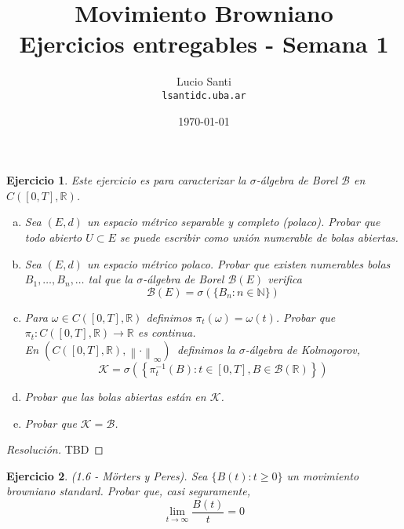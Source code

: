 \documentclass[a4paper,11pt]{article}
\title{Movimiento Browniano\\
      \small{Ejercicios entregables - Semana 1}}
\author{Lucio Santi\\
        \texttt{lsanti\at dc.uba.ar}}
\date{\today}
\newcommand{\norm}[1]{\left\lVert#1\right\rVert}
\newcommand{\CT}{\ensuremath{C([0,T], \mathbb{R})}}
\newcommand{\CTesp}{\ensuremath{(C([0,T], \mathbb{R}), \norm{\cdot}_{\infty})}}
\newcommand{\Bor}[1]{\ensuremath{\mathcal{B}(#1)}}
\newtheorem*{ej}{Ejercicio}
\begin{document}
\maketitle

\begin{ej} 
    Este ejercicio es para caracterizar la $\sigma$-álgebra de Borel
    $\mathcal{B}$ en \CT.

    \begin{enumerate}[a)]
        \item Sea $(E,d)$ un espacio métrico separable y completo (polaco).
        Probar que todo abierto $U \subset E$ se puede escribir como unión
        numerable de bolas abiertas.
        
        \item Sea $(E,d)$ un espacio métrico polaco. Probar que existen 
        numerables bolas $B_1, \dots, B_n, \dots$ tal que la $\sigma$-álgebra
        de Borel \Bor{E} verifica
        $$\Bor{E} = \sigma\left(\{B_n : n \in \mathbb{N} \}\right)$$

        \item Para $\omega \in \CT$ definimos $\pi_t(\omega) = \omega(t)$.
        Probar que $\pi_t : \CT \rightarrow \mathbb{R}$ es continua.\\

        En \CTesp \, definimos la $\sigma$-álgebra de Kolmogorov,
        $$\mathcal{K} = \sigma\left(\left\{\pi_{t}^{-1}(B) : t \in [0,T],
        B \in \Bor{\mathbb{R}} \right\}\right)$$

        \item Probar que las bolas abiertas están en $\mathcal{K}$.

        \item Probar que $\mathcal{K} = \mathcal{B}$.
    \end{enumerate}

\end{ej}

\begin{proof}[Resoluci\'on]
TBD
\end{proof}


\begin{ej}
    (1.6 - Mörters y Peres). Sea $\{B(t) : t \geq 0\}$ un movimiento browniano
    standard. Probar que, casi seguramente,
    $$\lim_{t \to \infty}{\frac{B(t)}{t}} = 0$$ 
\end{ej}
\end{document}
